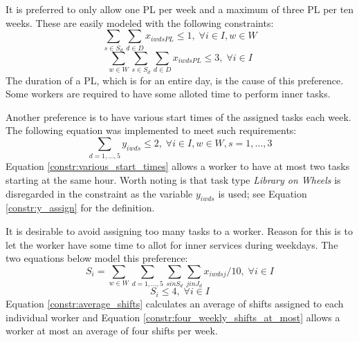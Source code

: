 It is preferred to only allow one PL per week and a maximum of three PL per ten weeks. These are easily modeled with the following constraints:
\begin{equation} \label{constr:one_PL}
\sum_{s \in S_d}\sum_{d \in D} x_{iwdsPL} \leq 1, \; \forall i\in I, w \in W
\end{equation}
\begin{equation} \label{constr:three_PL}
\sum_{w \in W}\sum_{s \in S_d}\sum_{d \in D} x_{iwdsPL} \leq 3, \; \forall i\in I
\end{equation}
The duration of a PL, which is for an entire day, is the cause of this preference. Some workers are required to have some alloted time to perform inner tasks.

Another preference is to have various start times of the assigned tasks each week. The following equation was implemented to meet such requirements:
\begin{equation} \label{constr:various_start_times}
\sum_{d = 1, \ldots, 5} y_{iwds} \leq 2, \; \forall i\in I, w \in W, s = 1, \ldots, 3
\end{equation}
Equation \ref{constr:various_start_times} allows a worker to have at most two tasks starting at the same hour. Worth noting is that task type \textit{Library on Wheels} is disregarded in the constraint as the variable $y_{iwds}$ is used; see Equation \ref{constr:y_assign} for the definition.

It is desirable to avoid assigning too many tasks to a worker. Reason for this is to let the worker have some time to allot for inner services during weekdays. The two equations below model this preference:
\begin{equation} \label{constr:average_shifts}
S_i = \sum_{w \in W} \sum_{d = 1, \ldots, 5} \sum_{s in S_d} \sum_{j in J_d} x_{iwdsj}/10, \; \forall i \in I
\end{equation}
\begin{equation} \label{constr:four_weekly_shifts_at_most}
S_i \leq 4, \; \forall i\in I
\end{equation}
Equation \ref{constr:average_shifts} calculates an average of shifts assigned to each individual worker and Equation \ref{constr:four_weekly_shifts_at_most} allows a worker at most an average of four shifts per week.

